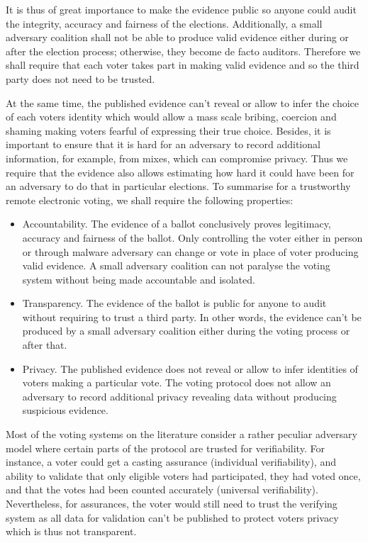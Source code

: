 \documentclass[12pt]{article}
\begin{document}
It is thus of great importance to make the evidence public so anyone could audit the integrity, accuracy and fairness of the elections. Additionally, a small adversary coalition shall not be able to produce valid evidence either during or after the election process; otherwise, they become de facto auditors. Therefore we shall require that each voter takes part in making valid evidence and so the third party does not need to be trusted.

At the same time, the published evidence can't reveal or allow to infer the choice of each voters identity which would allow a mass scale bribing, coercion and shaming making voters fearful of expressing their true choice. Besides, it is important to ensure that it is hard for an adversary to record additional information, for example, from mixes, which can compromise privacy. Thus we require that the evidence also allows estimating how hard it could have been for an adversary to do that in particular elections. To summarise for a trustworthy remote electronic voting, we shall require the following properties:

\begin{itemize}
\item Accountability. The evidence of a ballot conclusively proves legitimacy, accuracy and fairness of the ballot. Only controlling the voter either in person or through malware adversary can change or vote in place of voter producing valid evidence. A small adversary coalition can not paralyse the voting system without being made accountable and isolated. 
  
\item Transparency. The evidence of the ballot is public for anyone to audit without requiring to trust a third party. In other words, the evidence can't be produced by a small adversary coalition either during the voting process or after that. 
  
\item Privacy. The published evidence does not reveal or allow to infer identities of voters making a particular vote. The voting protocol does not allow an adversary to record additional privacy revealing data without producing suspicious evidence.
\end{itemize}

Most of the voting systems on the literature consider a rather peculiar adversary model where certain parts of the protocol are trusted for verifiability. For instance, a voter could get a casting assurance (individual verifiability), and ability to validate that only eligible voters had participated, they had voted once, and that the votes had been counted accurately (universal verifiability).  Nevertheless, for assurances, the voter would still need to trust the verifying system as all data for validation can't be published to protect voters privacy which is thus not transparent.
\end{document}
